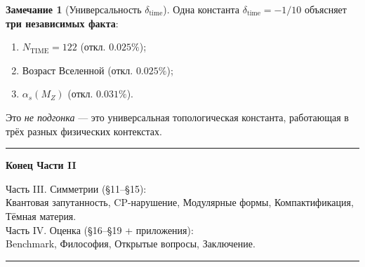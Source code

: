 \documentclass[11pt,a4paper]{article}
\theoremstyle{definition}
\newtheorem{remark}[theorem]{Замечание}
\begin{document}
\begin{remark}[Универсальность $\delta_{\text{time}}$]
\label{rem:delta-time-universal-review}
Одна константа $\delta_{\text{time}} = -1/10$ объясняет 
\textbf{три независимых факта}:
\begin{enumerate}
    \item $N_{\text{TIME}} = 122$ (откл. $0.025\%$);
    \item Возраст Вселенной (откл. $0.025\%$);
    \item $\alpha_s(M_Z)$ (откл. $0.031\%$).
\end{enumerate}
Это \emph{не подгонка} — это универсальная топологическая 
константа, работающая в трёх разных физических контекстах.
\end{remark}

\vfill

\begin{center}
\rule{0.6\textwidth}{0.4pt}

\vspace{0.5cm}

{\large\bfseries Конец Части II}

\vspace{0.3cm}

{\small
Часть III. Симметрии (§11–§15): \\
Квантовая запутанность, CP-нарушение, Модулярные формы, 
Компактификация, Тёмная материя. \\
Часть IV. Оценка (§16–§19 + приложения): \\
Benchmark, Философия, Открытые вопросы, Заключение.
}

\vspace{0.5cm}

\rule{0.6\textwidth}{0.4pt}
\end{center}


\end{document}
